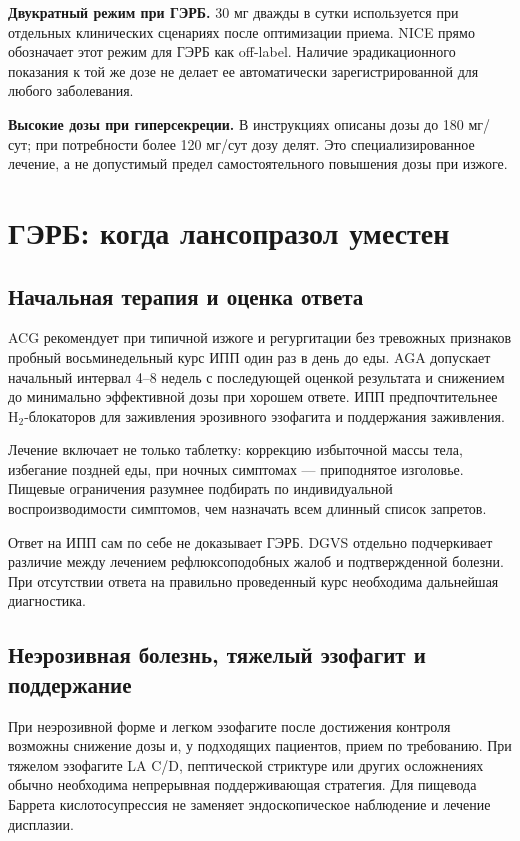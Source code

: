 \documentclass[11pt,a4paper,notitlepage]{report}
\newcommand{\src}[1]{\unskip\space\cite{#1}}
\begin{document}
\textbf{Двукратный режим при ГЭРБ.} 30 мг дважды в сутки используется при отдельных клинических сценариях после оптимизации приема. NICE прямо обозначает этот режим для ГЭРБ как off-label. Наличие эрадикационного показания к той же дозе не делает ее автоматически зарегистрированной для любого заболевания.\src{nice}

\textbf{Высокие дозы при гиперсекреции.} В инструкциях описаны дозы до 180 мг/сут; при потребности более 120 мг/сут дозу делят. Это специализированное лечение, а не допустимый предел самостоятельного повышения дозы при изжоге.\src{emc}

\section{ГЭРБ: когда лансопразол уместен}
\label{sec:gerd}

\subsection{Начальная терапия и оценка ответа}
ACG рекомендует при типичной изжоге и регургитации без тревожных признаков пробный восьминедельный курс ИПП один раз в день до еды. AGA допускает начальный интервал 4--8 недель с последующей оценкой результата и снижением до минимально эффективной дозы при хорошем ответе. ИПП предпочтительнее H$_2$-блокаторов для заживления эрозивного эзофагита и поддержания заживления.\src{acggerd,agagerd}

Лечение включает не только таблетку: коррекцию избыточной массы тела, избегание поздней еды, при ночных симптомах --- приподнятое изголовье. Пищевые ограничения разумнее подбирать по индивидуальной воспроизводимости симптомов, чем назначать всем длинный список запретов.\src{acggerd,agagerd}

Ответ на ИПП сам по себе не доказывает ГЭРБ. DGVS отдельно подчеркивает различие между лечением рефлюксоподобных жалоб и подтвержденной болезни. При отсутствии ответа на правильно проведенный курс необходима дальнейшая диагностика.\src{dgvs}

\subsection{Неэрозивная болезнь, тяжелый эзофагит и поддержание}
При неэрозивной форме и легком эзофагите после достижения контроля возможны снижение дозы и, у подходящих пациентов, прием по требованию. При тяжелом эзофагите LA C/D, пептической стриктуре или других осложнениях обычно необходима непрерывная поддерживающая стратегия. Для пищевода Баррета кислотосупрессия не заменяет эндоскопическое наблюдение и лечение дисплазии.\src{agadepres,dgvs,nice}
\end{document}

